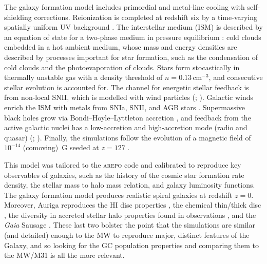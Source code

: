 \documentclass[a4paper,fleqn,usenatbib]{mnras}
\begin{document}
The galaxy formation model includes primordial and metal-line cooling with 
self-shielding corrections. Reionization is completed at redshift six by a
time-varying spatially uniform UV background \citep{2009ApJ...703.1416F, 
2013MNRAS.436.3031V}. The interstellar medium (ISM) is described by an equation of 
state for a two-phase medium in pressure equilibrium \citep{2003MNRAS.339..289S}: 
cold clouds embedded in a hot ambient medium, whose mass and energy densities
are described by processes important for star formation, such as the condensation 
of cold clouds and the photoevaporation of clouds. Stars form stocastically in 
thermally unstable gas with a density threshold of $n = 0.13 \, \text{cm}^{-3}$,
and consecutive stellar evolution is accounted for. The channel for energetic
stellar feedback is from non-local SNII, which is modelled with wind particles
(\citealt{2014MNRAS.437.1750M}; ). Galactic 
winds enrich the ISM
with metals from SNIa, SNII, and AGB stars \citep{2013MNRAS.436.3031V}. Supermassive
black holes grow via Bondi–Hoyle–Lyttleton accretion \citep{1944MNRAS.104..273B,
1952MNRAS.112..195B}, and feedback from the active galactic nuclei has a low-accretion
and high-accretion mode (radio and quasar) (\citealt{2005MNRAS.361..776S, 
2014MNRAS.437.1750M}; ). Finally, the simulations 
follow the evolution of a magnetic field of $10^{-14}$ (comoving)~G seeded at 
$z = 127$ \citep{2013MNRAS.432..176P, 2014ApJ...783L..20P}.

This model was tailored to the \textsc{arepo} code and calibrated to reproduce
key observables of galaxies, such as the history of the cosmic star formation rate
density, the stellar mass to halo mass relation, and galaxy luminosity functions.
The galaxy formation model produces realistic spiral galaxies at redshift $z=0$.
Moreover, Auriga reproduces the HI disc properties \citep{2017MNRAS.466.3859M},
the chemical thin/thick disc \citep{2018MNRAS.474.3629G}, the diversity in 
accreted stellar halo properties found in observations \citep{2019MNRAS.485.2589M},
and the \textit{Gaia} Sausage \citep{2019MNRAS.484.4471F}. These last two 
bolster the point that the simulations are similar (and detailed) enough to the 
MW to reproduce major, distinct features of the Galaxy, and so looking for the 
GC population properties and comparing them to the MW/M31 is all the more relevant. 
\end{document}

